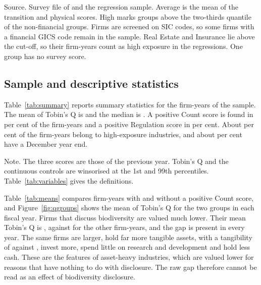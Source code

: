 \documentclass[12pt,a4paper]{article}
\newcommand{\tablenote}[1]{\par\smallskip\begin{minipage}{\linewidth}\footnotesize\setstretch{1.05}#1\end{minipage}}
\newcommand{\widetable}[1]{\resizebox{\ifdim\width>\linewidth\linewidth\else\width\fi}{!}{}}
\begin{document}
\begin{table}[!htbp]
\centering\small
\caption{Survey-based exposure and disclosure by GICS industry group}\label{tab:industry}
\widetable{tables/tab_industry}
\tablenote{Source. Survey file of \citet{giglio2026} and the regression sample. Average is the mean of the transition and physical scores. High marks groups above the two-thirds quantile of the non-financial groups. Firms are screened on SIC codes, so some firms with a financial GICS code remain in the sample. Real Estate and Insurance lie above the cut-off, so their \nHighFinFY{} firm-years count as high exposure in the regressions. One group has no survey score.}
\end{table}

\subsection{Sample and descriptive statistics}

Table~\ref{tab:summary} reports summary statistics for the \nFinal{} firm-years of the sample. The mean of Tobin's Q is \meanQ{} and the median is \medianQ{}. A positive Count score is found in \pctCount{} per cent of the firm-years and a positive Regulation score in \pctReg{} per cent. About \pctHigh{} per cent of the firm-years belong to high-exposure industries, and about \pctDecember{} per cent have a December year end.

\begin{table}[!htbp]
\centering\small
\caption{Summary statistics}\label{tab:summary}
\widetable{tables/tab_summary}
\tablenote{Note. The three scores are those of the previous year. Tobin's Q and the continuous controls are winsorised at the 1st and 99th percentiles. Table~\ref{tab:variables} gives the definitions.}
\end{table}

Table~\ref{tab:means} compares firm-years with and without a positive Count score, and Figure~\ref{fig:qgroups} shows the mean of Tobin's Q for the two groups in each fiscal year. Firms that discuss biodiversity are valued much lower. Their mean Tobin's Q is \meanQOne{}, against \meanQZero{} for the other firm-years, and the gap is present in every year. The same firms are larger, hold far more tangible assets, with a tangibility of \tangOne{} against \tangZero{}, invest more, spend little on research and development and hold less cash. These are the features of asset-heavy industries, which are valued lower for reasons that have nothing to do with disclosure. The raw gap therefore cannot be read as an effect of biodiversity disclosure.
\end{document}
